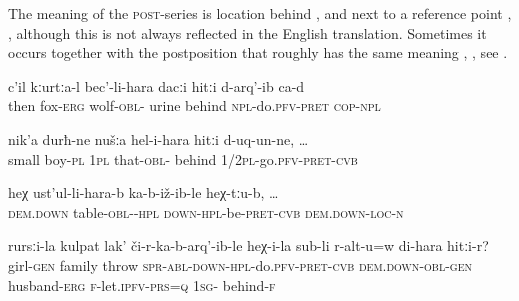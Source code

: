 The meaning of the \textsc{post}-series is location behind ,  and next to a reference point , , although this is not always reflected in the English translation. Sometimes it occurs together with the postposition  that roughly has the same meaning , , see .
%
\begin{exe} 
	\ex	\label{Then the fox peed behind the wolf}
	\gll	c'il	kːurtːa-l	bec'-li-hara	dacːi	hitːi	d-arq'-ib ca-d	 \\
		then	fox-\textsc{erg}	wolf-\textsc{obl}-	urine	behind	\textsc{npl}-do.\textsc{pfv}-\textsc{pret} \textsc{cop-npl}\\
	\glt	{}
	
	\ex	\label{when we small children ran behind it}
	\gll	nik'a	durħ-ne	nušːa	hel-i-hara	hitːi	d-uq-un-ne, \ldots\\
		small	boy-\textsc{pl}	1\textsc{pl}	that-\textsc{obl}-	behind	1/2\textsc{pl}-go.\textsc{pfv}-\textsc{pret}-\textsc{cvb}\\
	\glt	{}
	
	\ex	\label{they are sitting at the table}
	\gll	heχ	ust'ul-li-hara-b	ka-b-iž-ib-le	heχ-tːu-b, \ldots\\
		\textsc{dem.down}	table-\textsc{obl}--\textsc{hpl} \textsc{down-hpl}-be-\textsc{pret}-\textsc{cvb}	\textsc{dem.down}-\textsc{loc}-\textsc{n}\\
	\glt	{}
	
	\ex	\label{Will her husband allow her (i.e. my daughter) to throw away the family and (sit) with me?}
	\gll	rursːi-la	kulpat	lak' či-r-ka-b-arq'-ib-le	heχ-i-la sub-li	r-alt-u=w	di-hara	hitːi-r?\\
		girl-\textsc{gen}	family	throw \textsc{spr}-\textsc{abl-down}-\textsc{hpl}-do.\textsc{pfv}-\textsc{pret}-\textsc{cvb}	\textsc{dem.down}-\textsc{obl}-\textsc{gen}	husband-\textsc{erg}	\textsc{f}-let.\textsc{ipfv}-\textsc{prs}=\textsc{q}	1\textsc{sg}-	behind-\textsc{f}\\
	\glt	{}
\end{exe}


